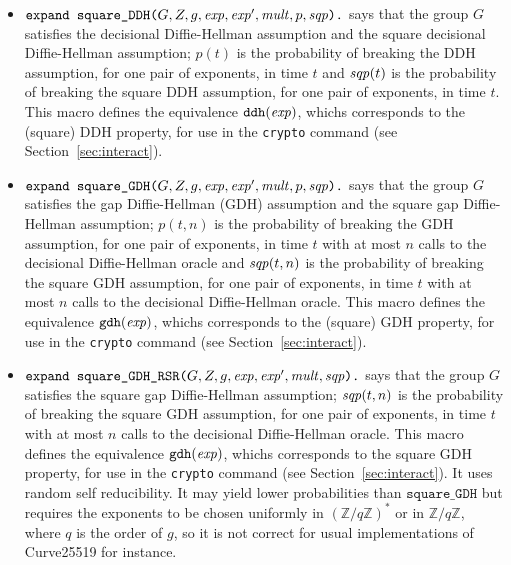 \documentclass{article}
\begin{document}
\begin{itemize}
\begin{itemize}
\begin{itemize}
     \item
       $\texttt{expand\ square\_DDH(}G, Z, g, \mathit{exp}, \mathit{exp}',
       \mathit{mult}, p, \mathit{sqp}\texttt{).}$
       says that the group $G$ satisfies the decisional Diffie-Hellman
       assumption and the square decisional Diffie-Hellman assumption;
       $p(t)$ is the probability of breaking the DDH assumption, for
       one pair of exponents, in time $t$ and $\mathit{sqp}(t)$ is the
       probability of breaking the square DDH assumption, for one pair
       of exponents, in time $t$.  This macro defines the equivalence
       $\texttt{ddh}(\mathit{exp})$, whichs corresponds to the (square)
       DDH property, for use in the \texttt{crypto} command (see
       Section~\ref{sec:interact}).

     \item
       $\texttt{expand\ square\_GDH(}G, Z, g, \mathit{exp}, \mathit{exp}',
       \mathit{mult}, p, \mathit{sqp}\texttt{).}$
       says that the group $G$ satisfies the gap Diffie-Hellman (GDH)
       assumption and the square gap Diffie-Hellman assumption;
       $p(t,n)$ is the probability of breaking the GDH assumption, for
       one pair of exponents, in time $t$ with at most $n$ 
       calls to the decisional Diffie-Hellman oracle and $\mathit{sqp}(t,n)$ is the
       probability of breaking the square GDH assumption, for one pair
       of exponents, in time $t$ with at most $n$ 
       calls to the decisional Diffie-Hellman oracle.  This macro defines the equivalence
       $\texttt{gdh}(\mathit{exp})$, whichs corresponds to the (square)
       GDH property, for use in the \texttt{crypto} command (see
       Section~\ref{sec:interact}).

     \item $\texttt{expand\ square\_GDH\_RSR(}G, Z, g, \mathit{exp}, \mathit{exp}',
       \mathit{mult}, \mathit{sqp}\texttt{).}$
       says that the group $G$ satisfies the square gap Diffie-Hellman assumption;
       $\mathit{sqp}(t,n)$ is the
       probability of breaking the square GDH assumption, for one pair
       of exponents, in time $t$ with at most $n$ 
       calls to the decisional Diffie-Hellman oracle.  This macro defines the equivalence
       $\texttt{gdh}(\mathit{exp})$, whichs corresponds to the square
       GDH property, for use in the \texttt{crypto} command (see
       Section~\ref{sec:interact}). It uses random self
       reducibility. It may yield lower probabilities than
       $\texttt{square\_GDH}$ but requires the exponents to be chosen
       uniformly in $(\mathbb{Z}/q\mathbb{Z})^*$ or in $\mathbb{Z}/q\mathbb{Z}$, where $q$ is the order
       of $g$, so it is not correct for usual implementations of Curve25519 for instance.


\end{itemize}
\end{itemize}
\end{itemize}
\end{document}
